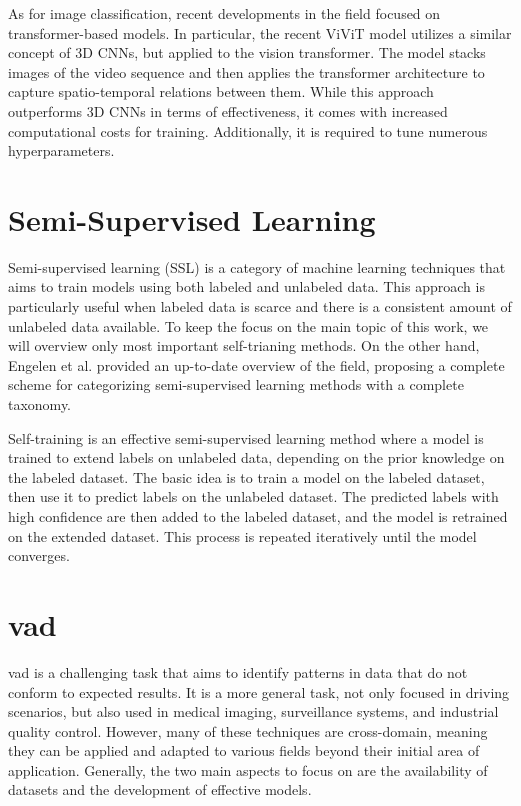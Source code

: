 As for image classification, recent developments in the field focused on 
transformer-based models. In particular, the recent ViViT model \cite{vivit} 
utilizes a similar concept of 3D CNNs, but applied to the vision transformer. 
The model stacks images of the video sequence and then applies the transformer 
architecture to capture spatio-temporal relations between them. 
While this approach outperforms 3D CNNs in terms of effectiveness, it comes with 
increased computational costs for training. Additionally, it is required to 
tune numerous hyperparameters.

\section{Semi-Supervised Learning}
Semi-supervised learning (SSL) is a category of machine learning techniques 
that aims to train models using both labeled and unlabeled data. This approach 
is particularly useful when labeled data is scarce and there is a consistent 
amount of unlabeled data available.
To keep the focus on the main topic of this work, we will overview only most 
important self-trianing methods. On the other hand, Engelen et al. 
\cite{ssl_survey} 
provided an up-to-date overview of the field, proposing a complete 
scheme for categorizing semi-supervised learning methods with a complete 
taxonomy.

Self-training is an effective semi-supervised learning method where a model is 
trained to extend labels on unlabeled data, depending on the prior knowledge on 
the labeled dataset. The basic idea is to train a model on the labeled dataset, 
then use it to predict labels on the unlabeled dataset. The predicted labels with 
high confidence are then added to the labeled dataset, and the model is retrained 
on the extended dataset. This process is repeated iteratively until the model 
converges.

\section{\acl{vad}}
\ac{vad} is a challenging task that aims to 
identify patterns in data that do not conform to expected results. It is a 
more general task, not only focused in driving scenarios, but also used in 
medical imaging, surveillance systems, and industrial quality control.
However, many of these techniques are cross-domain, meaning they can be applied and 
adapted to various fields beyond their initial area of application.
Generally, the two main aspects to focus on are the availability 
of datasets and the development of effective models.

